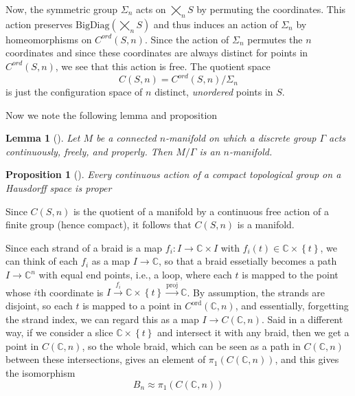 \documentclass[reqno]{amsart}
\newtheorem{lemma}[theorem]{Lemma}
\newtheorem{proposition}[theorem]{Proposition}
\theoremstyle{definition}
\theoremstyle{remark}
\begin{document}
Now, the symmetric group $\Sigma_n$ acts on 
$\bigtimes_n S$ by permuting
the coordinates. This action preserves $\text{BigDiag}\left( 
\bigtimes_n S\right) $ and thus induces an action
of $\Sigma_n$ by homeomorphisms on
$C^{ord}\left( S,n \right) $. Since the action of
$\Sigma_n$ permutes the $n$ coordinates and since
these coordinates are always distinct
for points in $C^{ord}\left( S,n \right) $, we see
that this action is free. The quotient space
\[
C \left( S,n \right) =
C^{ord}\left( S,n \right) / \Sigma_n
\] 
is just the configuration space of $n$ distinct,
\textit{unordered} points in $S$.


Now we note the following lemma \cite[Cor~12.27]{LeeTM}
and proposition \cite[Prop~12.22]{LeeTM}

\begin{lemma}[]
    Let $M$ be a connected $n$-manifold on which a discrete
    group $\Gamma$ acts continuously, freely, and properly.
    Then $M / \Gamma $ is an $n$-manifold.
\end{lemma}

\begin{proposition}[]
    Every continuous action of a compact topological group
    on a Hausdorff space is proper
\end{proposition}


Since $C\left( S,n \right) $ is the quotient of a
manifold by a continuous free action of a finite group (hence
compact),
it follows that $C\left( S,n \right) $ is a manifold.

Since each strand of a braid is a map
$f_i \colon I \to \mathbb{C} \times I$ with
$f_i(t) \in \mathbb{C} \times \left\{ t \right\} $, we can
think of each $f_i$ as a map
$I \to \mathbb{C}$, so that
a braid essetially becomes a path
$I \to \mathbb{C}^{n}$ with equal end points, i.e., a loop, where
each $t$ is mapped to the point
whose $i$th coordinate is $I \stackrel{f_i}{\to} \mathbb{C} 
\times \left\{ t \right\} \stackrel{\text{proj}}{\to }
\mathbb{C}
$. By assumption, the strands are disjoint, so
each  $t$ is mapped to a point in
$C^{\text{ord}}\left( \mathbb{C},n \right) $,
and essentially, forgetting
the strand index, we can regard this as a map
$I \to C \left( \mathbb{C}, n \right) $. Said in a different
way, if we consider a slice $\mathbb{C} \times \left\{ t \right\} $
and intersect it with any braid, then we get a point
in $C \left( \mathbb{C},n \right) $, so the whole braid,
which can be seen as a path in $C \left( \mathbb{C},n \right) $ 
between these intersections, gives an element
of $\pi_1 \left( C \left( \mathbb{C},n \right)  \right) $, and
this
gives the isomorphism
\[
B_n \approx \pi_1 \left( C \left( \mathbb{C}, n \right)  \right) 
\] 
\end{document}
